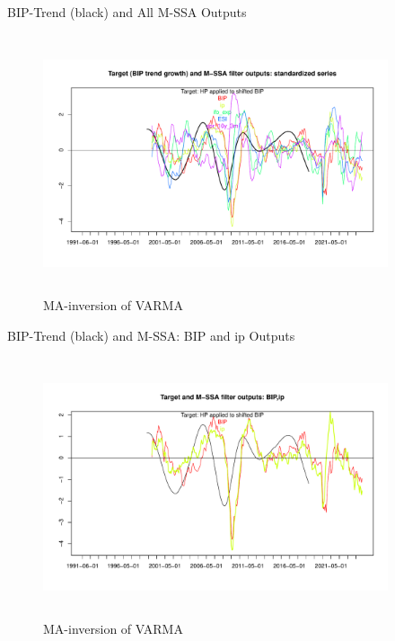 \documentclass{beamer}
\begin{document}
\begin{frame} {BIP-Trend (black) and All M-SSA Outputs}
\begin{figure}[H]\begin{center}\includegraphics[height=3in, width=4in]{M_SSA_output_1.pdf}\caption{MA-inversion of VARMA\label{cor}}\end{center}\end{figure}\end{frame}


\begin{frame} {BIP-Trend (black) and M-SSA: BIP and ip Outputs}
\begin{figure}[H]\begin{center}\includegraphics[height=3in, width=4in]{M_SSA_output_15.pdf}\caption{MA-inversion of VARMA\label{cor}}\end{center}\end{figure}\end{frame}
\end{document}
